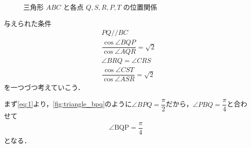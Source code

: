 \documentclass[../../main.tex]{subfiles}
\begin{document}
\begin{figure}[htb]
  \caption{三角形 $ABC$ と各点 $Q, S, R, P, T$ の位置関係}
  \label{fig:triangle_abc}
\end{figure}

与えられた条件
\begin{align}
  & PQ // BC \label{eq:1}\\
  & \dfrac{\cos\angle BQP}{\cos\angle AQR}=\sqrt{2} \label{eq:2} \\
  & \angle BRQ = \angle CRS \label{eq:3}\\
  & \dfrac{\cos\angle CST}{\cos\angle ASR}=\sqrt{2} \label{eq:4}
\end{align}
を一つづつ考えていこう．

まず\cref{eq:1}より，\cref{fig:triangle_bpq}のように$\angle BPQ = \dfrac{\pi}{2}$だから，$\angle PBQ = \dfrac{\pi}{4}$と合わせて
\begin{align}
  \angle \mathrm{BQP} = \dfrac{\pi}{4} \label{eq:5}
\end{align}
となる．
\end{document}
